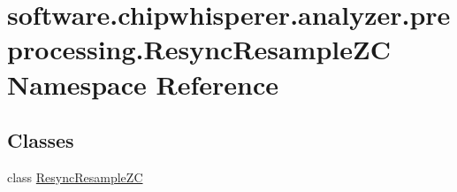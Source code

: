 \hypertarget{namespacesoftware_1_1chipwhisperer_1_1analyzer_1_1preprocessing_1_1ResyncResampleZC}{}\section{software.\+chipwhisperer.\+analyzer.\+preprocessing.\+Resync\+Resample\+Z\+C Namespace Reference}
\label{namespacesoftware_1_1chipwhisperer_1_1analyzer_1_1preprocessing_1_1ResyncResampleZC}
\subsection*{Classes}
\begin{DoxyCompactItemize}
\item 
class \hyperlink{classsoftware_1_1chipwhisperer_1_1analyzer_1_1preprocessing_1_1ResyncResampleZC_1_1ResyncResampleZC}{Resync\+Resample\+Z\+C}
\end{DoxyCompactItemize}
